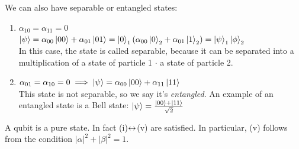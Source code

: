 We can also have separable or entangled states:
\begin{enumerate}
    \item $\alpha_{10} = \alpha_{11} = 0$\\
    $\left|\psi\right\rangle = \alpha_{00}\left|00\right\rangle + \alpha_{01}\left|01\right\rangle = \left|0\right\rangle_1\left(\alpha_{00}\left|0\right\rangle_2 + \alpha_{01} \left|1\right\rangle_2\right) = \left|\psi\right\rangle_1 \left|\phi\right\rangle_2$\\
    In this case, the state is called separable, because it can be separated into a multiplication of a state of particle 1 $\cdot$ a state of particle 2.
    \item $\alpha_{01} = \alpha_{10} = 0 \implies    \left|\psi\right\rangle = \alpha_{00}\left|00\right\rangle + \alpha_{11}\left|11\right\rangle$\\
    This state is not separable, so we say it's \textit{entangled}. An example of an entangled state is a Bell state: $\left|\psi\right\rangle = \frac {\left|00\right\rangle + \left|11\right\rangle}{\sqrt 2}$

\end{enumerate}

A qubit is a pure state. In fact (i)$\leftrightarrow$(v) are satisfied. In particular, (v) follows from the condition $|\alpha|^2 + |\beta|^2 = 1$.


